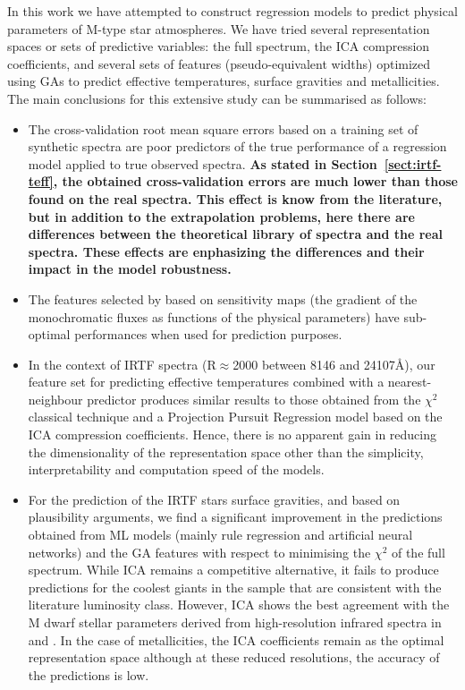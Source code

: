 
In this work we have attempted to construct regression models to
predict physical parameters of M-type star atmospheres. We have tried
several representation spaces or sets of predictive variables: the
full spectrum, the ICA compression coefficients, and several sets of
features (pseudo-equivalent widths) optimized using GAs to predict
effective temperatures, surface gravities and metallicities. The main
conclusions for this extensive study can be summarised as follows:
\begin{itemize}

\item The cross-validation root mean square errors based on a training 
      set of synthetic spectra  are poor predictors of the true performance 
      of a regression model applied to true observed spectra.
      \textbf{
	As stated in Section~\ref{sect:irtf-teff}, the obtained 
	cross-validation errors are much lower than those found on the
	real spectra. This effect is know from the literature, but 
	in addition to the extrapolation problems, 
	here there are differences between the theoretical 
	library of spectra and the real spectra.
	These effects are enphasizing the differences and their
	impact in the model robustness.
      }

\item The features selected by \cite{cesetti} based on sensitivity 
      maps (the gradient of the monochromatic fluxes as functions of the 
      physical parameters) have sub-optimal performances when used 
      for prediction purposes.

\item In the context of IRTF spectra (R$\approx$2000 between 
      8146 and 24107\AA), our feature set for predicting effective 
      temperatures combined with a nearest-neighbour predictor produces 
      similar results to those obtained from the $\chi^2$ classical technique 
      and a Projection Pursuit Regression model based on the ICA compression 
      coefficients. Hence, there is no apparent gain in reducing the 
      dimensionality of the representation space other than the simplicity, 
      interpretability and computation speed of the models.   

\item For the prediction of the IRTF stars surface gravities, and
  based on plausibility arguments, we find a significant improvement
  in the predictions obtained from ML models (mainly
  rule regression and artificial neural networks) and the GA features
  with respect to minimising the $\chi^2$ of the full spectrum. While
  ICA remains a competitive alternative, it fails to produce
  predictions for the coolest giants in the sample that are consistent
  with the literature luminosity class. However, ICA shows the best
  agreement with the M dwarf stellar parameters derived from
  high-resolution infrared spectra in \cite{esm1} and \cite{esm2}. In
  the case of metallicities, the ICA coefficients remain as the
  optimal representation space although at these reduced resolutions,
  the accuracy of the predictions is low.


\end{itemize}

